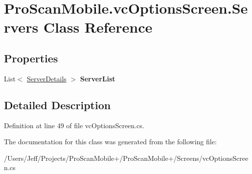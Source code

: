 \hypertarget{class_pro_scan_mobile_1_1vc_options_screen_1_1_servers}{\section{Pro\-Scan\-Mobile.\-vc\-Options\-Screen.\-Servers Class Reference}
\label{class_pro_scan_mobile_1_1vc_options_screen_1_1_servers}
}
\subsection*{Properties}
\begin{DoxyCompactItemize}
\item 
\hypertarget{class_pro_scan_mobile_1_1vc_options_screen_1_1_servers_ab91832dd19b800740986a06b64affe16}{List$<$ \hyperlink{class_pro_scan_mobile_1_1vc_options_screen_1_1_server_details}{Server\-Details} $>$ {\bfseries Server\-List}}\label{class_pro_scan_mobile_1_1vc_options_screen_1_1_servers_ab91832dd19b800740986a06b64affe16}

\end{DoxyCompactItemize}


\subsection{Detailed Description}


Definition at line 49 of file vc\-Options\-Screen.\-cs.



The documentation for this class was generated from the following file\-:\begin{DoxyCompactItemize}
\item 
/\-Users/\-Jeff/\-Projects/\-Pro\-Scan\-Mobile+/\-Pro\-Scan\-Mobile+/\-Screens/vc\-Options\-Screen.\-cs\end{DoxyCompactItemize}
